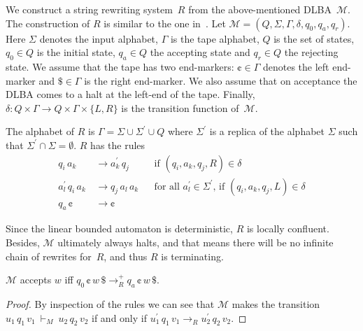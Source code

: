 \documentclass{lmcs} %
\theoremstyle{plain}\newtheorem{satz}[thm]{Satz} %
\begin{document}
We construct a string
rewriting system~$R$ from the above-mentioned DLBA~$\mathcal{M}$.  The construction of
$R$ is similar to the one in~\cite{bauer1984finite}. Let 
$\mathcal{M} = (Q, \Sigma, \Gamma, \delta, q_0, q_a, q_r)$. Here
$\Sigma$ denotes the input alphabet, $\Gamma$ is the tape alphabet, $Q$ is the set of states, $q_0 \in
Q$ is the initial state, $q_a \in Q$ the accepting state and
$q_r \in Q$ the rejecting state. We assume
that the tape has two end-markers: $\cent \in \Gamma$ denotes
the left end-marker and $\$ \in \Gamma$ is the right 
end-marker. We also assume that on acceptance
the DLBA comes to a halt at the left-end of the tape. Finally, 
$\delta:  Q \times \Gamma \rightarrow Q \times \Gamma \times \{L, R\}$
is the transition function of~$\mathcal{M}$. 

The alphabet of $R$ is $\Gamma = \Sigma \cup \Sigma^{\prime} \cup Q$
where $\Sigma^{\prime}$ is a replica of the alphabet
$\Sigma$ such that $\Sigma^{\prime} \cap \Sigma = \emptyset$.
$R$ has the rules
\begin{equation*}
\begin{aligned}
    q_i \, a_k \, &\rightarrow  a_k^{\prime}\, q_j 			&& \text{if }(q_i, a_k, q_j, R) \in \delta\\
    a_l^{\prime} \, q_i \, a_k \, &\rightarrow q_j \, a_l \, a_k	&& \text{for all } a_l^{\prime} \in \Sigma^{\prime} \text{, if }(q_i, a_k, q_j, L) \in \delta\\
    q_a \, \cent \, &\rightarrow \cent 					&& \text{ }
\end{aligned}
\end{equation*}

Since the linear bounded automaton is deterministic, $R$ is locally
confluent. Besides, $\mathcal{M}$ ultimately always halts, and that means
there will be no infinite chain of rewrites for~$R$, and thus $R$ is
terminating.

\begin{lem}\label{initialAccepting}
$\mathcal{M}$ accepts $w$ iff
$q_0\, \cent \, w \, \$ \rightarrow_R^{+} q_a\, \cent \, w\, \$ $.
\end{lem}
\begin{proof}
By inspection of the rules we can see that $\mathcal{M}$ makes the transition
$u_1\,q_1\,v_1 ~ \vdash_M^{} ~ {u_2}\, q_2\, v_2$ if and only if
$u_1^{\prime}\,q_1\,v_1 \rightarrow_R^{} u_2^{\prime}\, q_2\, v_2$.
\end{proof}
\end{document}
